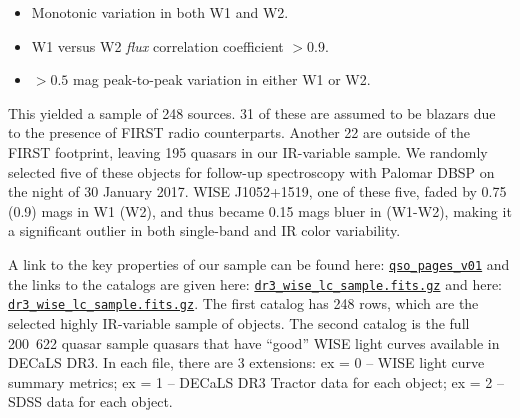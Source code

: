 \documentclass{emulateapj}
\begin{document}
\begin{itemize}
\item Monotonic variation in both W1 and W2.
\item W1 versus W2 \textit{flux} correlation coefficient $>$0.9.
\item $>0.5$ mag peak-to-peak variation in either W1 or W2.
\end{itemize}

This yielded a sample of 248 sources. 31 of these are assumed to be blazars 
due to the presence of FIRST radio counterparts. Another 22 are outside of the 
FIRST  footprint, leaving 195 quasars in our IR-variable sample. We randomly 
selected five of these objects for follow-up spectroscopy with Palomar DBSP on
the night of 30 January 2017. WISE J1052+1519, one of these five, 
faded by 0.75 (0.9) mags in W1 (W2), and thus became 0.15 mags bluer in 
(W1-W2), making it a significant outlier in both single-band and IR color 
variability.

A link to the key properties of our sample can be found here:
\href{http://portal.nersc.gov/project/cosmo/temp/ameisner/qso\_pages\_v01/}
{\tt qso\_pages\_v01} and the links to the catalogs are given here: 
\href{http://portal.nersc.gov/project/cosmo/temp/ameisner/dr3_wise_lc_sample.fits.gz}{{\tt dr3\_wise\_lc\_sample.fits.gz}} and here:
\href{http://portal.nersc.gov/project/cosmo/temp/ameisner/dr3_wise_lc_metrics_all_qso.fits.gz}{{\tt dr3\_wise\_lc\_sample.fits.gz}}. 
The first catalog has 248 rows, which are the selected highly
IR-variable sample of objects.  The second catalog is the full
\hbox{200 622} quasar sample quasars that have ``good'' WISE light
curves available in DECaLS DR3. In each file, there are 3 extensions:
ex = 0 -- WISE light curve summary metrics; ex = 1 -- DECaLS DR3
Tractor data for each object; ex = 2 -- SDSS data for each object.
\end{document}
